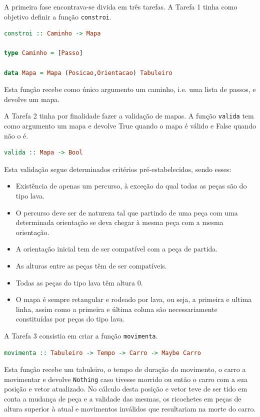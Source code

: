 \documentclass[a4paper]{report}
\begin{document}
A primeira fase encontrava-se divida em três tarefas. A Tarefa 1 tinha como
objetivo definir a função \texttt{constroi}.

\begin{lstlisting}[language=Haskell]
constroi :: Caminho -> Mapa

type Caminho = [Passo]

data Mapa = Mapa (Posicao,Orientacao) Tabuleiro
\end{lstlisting}

Esta função recebe como único argumento um caminho, i.e. uma lista de passos, e
devolve um mapa.

A Tarefa 2 tinha por finalidade fazer a validação de mapas. A função
\texttt{valida} tem como argumento um mapa e devolve True quando o mapa é válido
e False quando não o é.

\begin{lstlisting}[language=Haskell]
 valida :: Mapa -> Bool
\end{lstlisting}

Esta validação segue determinados critérios pré-estabelecidos, sendo esses:

\begin{itemize}
\item
  Existência de apenas um percurso, à exceção do qual todas as peças são
  do tipo lava.
\item
  O percurso deve ser de natureza tal que partindo de uma peça com uma
  determinada orientação se deva chegar à mesma peça com a mesma orientação.
\item
  A orientação inicial tem de ser compatível com a peça de partida.
\item
  As alturas entre as peças têm de ser compatíveis.
\item
  Todas as peças do tipo lava têm altura 0.
\item
  O mapa é sempre retangular e rodeado por lava, ou seja, a primeira e
  ultima linha, assim como a primeira e última coluna são
  necessariamente constituídas por peças do tipo lava.
\end{itemize}

A Tarefa 3 consistia em criar a função \texttt{movimenta}.

\begin{lstlisting}[language=Haskell]
 movimenta :: Tabuleiro -> Tempo -> Carro -> Maybe Carro
\end{lstlisting}

Esta função recebe um tabuleiro, o tempo de duração do movimento, o carro a
movimentar e devolve \texttt{Nothing} caso tivesse morrido ou então o carro com
a sua posição e vetor atualizado. No cálculo desta posição e vetor teve de ser
tido em conta a mudança de peça e a validade das mesmas, os ricochetes em peças
de altura superior à atual e movimentos inválidos que resultariam na morte do
carro.
\end{document}

